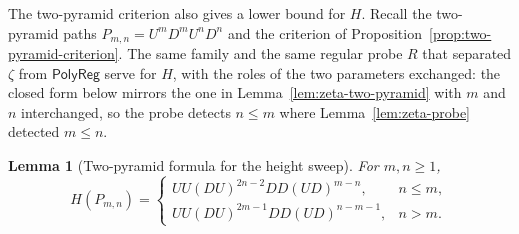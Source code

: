 \documentclass[11pt]{article}
\newtheorem{lemma}[theorem]{Lemma}
\theoremstyle{definition}
\newcommand{\polyreg}{\mathsf{PolyReg}}
\begin{document}
The two-pyramid criterion also gives a lower bound for $H$.  Recall the
two-pyramid paths $P_{m,n}=U^mD^mU^nD^n$ and the criterion of
Proposition~\ref{prop:two-pyramid-criterion}.  The same family and the same
regular probe $R$ that separated $\zeta$ from $\polyreg$ serve for $H$, with
the roles of the two parameters exchanged: the closed form below mirrors the
one in Lemma~\ref{lem:zeta-two-pyramid} with $m$ and $n$ interchanged, so the
probe detects $n\le m$ where Lemma~\ref{lem:zeta-probe} detected $m\le n$.

\begin{lemma}[Two-pyramid formula for the height sweep]
\label{lem:H-two-pyramid}
For $m,n\ge1$,
\[
H(P_{m,n})=
\begin{cases}
   UU(DU)^{2n-2}DD(UD)^{m-n}, & n\le m,\\[1mm]
   UU(DU)^{2m-1}DD(UD)^{n-m-1}, & n>m.
\end{cases}
\]
\end{lemma}
\end{document}
